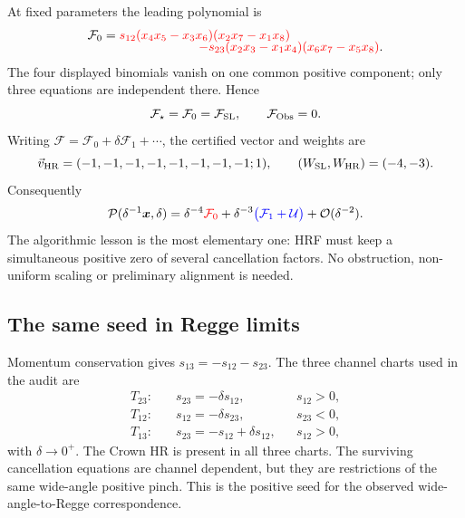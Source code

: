 \documentclass[a4paper,11pt]{article}
\newcommand{\x}{\boldsymbol{x}}
\newcommand{\FSL}{\mathcal F_{\rm SL}}
\newcommand{\FObs}{\mathcal F_{\rm Obs}}
\newcommand{\WSL}{W_{\rm SL}}
\newcommand{\WHR}{W_{\rm HR}}
\newcommand{\vHR}{\vec v_{\rm HR}}
\newcommand{\SLcolour}[1]{{\color{red}#1}}
\newcommand{\HRcolour}[1]{{\color{blue}#1}}
\newcommand{\Othercolour}[1]{{\color{black}#1}}
\begin{document}
At fixed parameters the leading polynomial is
\begin{align}
 \mathcal F_0={}&
 \SLcolour{s_{12}(x_4x_5-x_3x_6)(x_2x_7-x_1x_8)}
 \nonumber\\[-2mm]
 &\hspace{22mm}
 \SLcolour{-s_{23}(x_2x_3-x_1x_4)(x_6x_7-x_5x_8)}.
 \label{eq:crown-F0}
\end{align}
The four displayed binomials vanish on one common positive component; only
three equations are independent there.  Hence
\begin{equation}
 \mathcal F_\star=\mathcal F_0=\FSL,
 \qquad \FObs=0.
 \label{eq:crown-no-obstruction}
\end{equation}
Writing \(\mathcal F=\mathcal F_0+\delta\mathcal F_1+\cdots\), the certified
vector and weights are
\begin{equation}
 \vHR=(-1,-1,-1,-1,-1,-1,-1,-1;1),
 \qquad (\WSL,\WHR)=(-4,-3).
 \label{eq:crown-vector}
\end{equation}
Consequently
\begin{equation}
 \mathcal P(\delta^{-1}\x,\delta)
 =\delta^{-4}\SLcolour{\mathcal F_0}
 +\delta^{-3}\HRcolour{\bigl(\mathcal F_1+\mathcal U\bigr)}
 +\Othercolour{\mathcal O(\delta^{-2})}.
 \label{eq:crown-colours}
\end{equation}
The algorithmic lesson is the most elementary one: HRF must keep a
simultaneous positive zero of several cancellation factors.  No obstruction,
non-uniform scaling or preliminary alignment is needed.

\subsection{The same seed in Regge limits}

Momentum conservation gives \(s_{13}=-s_{12}-s_{23}\).  The three channel
charts used in the audit are
\begin{align}
 T_{23}:&\quad s_{23}=-\delta s_{12}, &&s_{12}>0,\nonumber\\
 T_{12}:&\quad s_{12}=-\delta s_{23}, &&s_{23}<0,\nonumber\\
 T_{13}:&\quad s_{23}=-s_{12}+\delta s_{12}, &&s_{12}>0,
 \label{eq:crown-regge-charts}
\end{align}
with \(\delta\to0^+\).  The Crown HR is present in all three charts.  The
surviving cancellation equations are channel dependent, but they are
restrictions of the same wide-angle positive pinch.  This is the positive
seed for the observed wide-angle-to-Regge correspondence.
\end{document}
